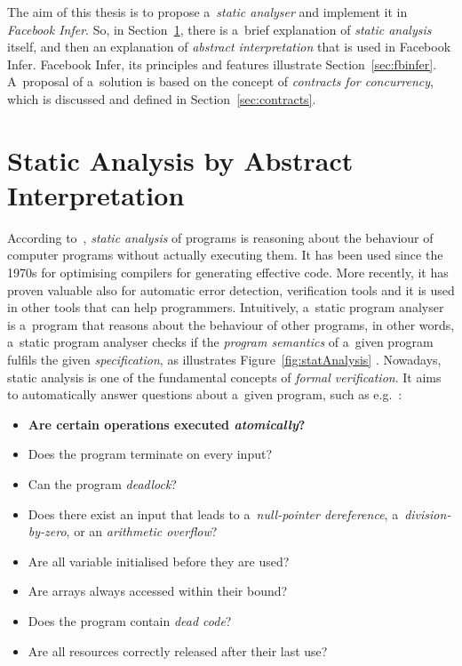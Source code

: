 The aim of this thesis is to propose a~\emph{static analyser} and implement
it in \emph{Facebook Infer}. So, in Section~\ref{sec:statAnalysisAI},
there is a~brief explanation of \emph{static analysis} itself, and then an
explanation of \emph{abstract interpretation} that is used in Facebook Infer.
Facebook Infer, its principles and features illustrate
Section~\ref{sec:fbinfer}. A~proposal of a~solution is based on the
concept of \emph{contracts for concurrency}, which is discussed and defined
in Section~\ref{sec:contracts}.


\section{Static Analysis by Abstract Interpretation}
\label{sec:statAnalysisAI}

According to~\cite{staticAnalysisMoller}, \emph{static analysis} of
programs is reasoning about the behaviour of computer programs without
actually executing them. It has been used since the 1970s for optimising
compilers for generating effective code. More recently, it has proven
valuable also for automatic error detection, verification tools and it
is used in other tools that can help programmers. Intuitively,
a~static program analyser is a~program that reasons about the behaviour
of other programs, in other words, a~static program analyser checks if the
\emph{program semantics} of a~given program fulfils the given
\emph{specification}, as illustrates Figure~\ref{fig:statAnalysis}
\cite{AIBasedFormalMethodsCousot}. Nowadays, static analysis is one of
the fundamental concepts of \emph{formal verification}. It aims to
automatically answer questions about a~given program, such as
e.g.~\cite{staticAnalysisMoller}:
\begin{itemize}
    \item
        \textbf{Are certain operations executed \emph{atomically}?}

    \item
        Does the program terminate on every input?

    \item
        Can the program \emph{deadlock}?

    \item
        Does there exist an input that leads to a~\emph{null-pointer
        dereference}, a~\emph{division-by-zero}, or an \emph{arithmetic
        overflow}?

    \item
        Are all variable initialised before they are used?

    \item
        Are arrays always accessed within their bound?

    \item
        Does the program contain \emph{dead code}?

    \item
        Are all resources correctly released after their last
        use?
\end{itemize}

